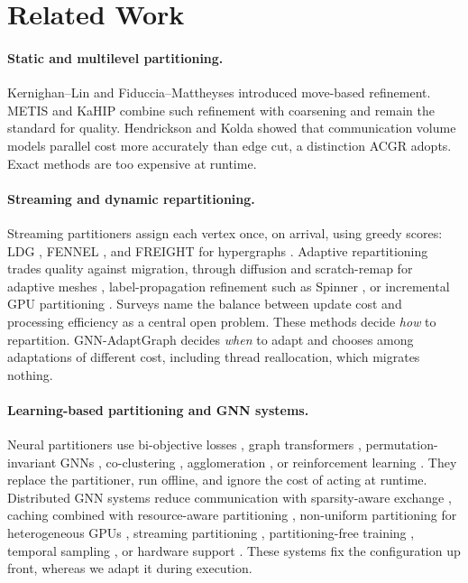 \section{Related Work}

\paragraph{Static and multilevel partitioning.}
Kernighan--Lin \cite{kernighan1970} and Fiduccia--Mattheyses \cite{fiduccia1982} introduced
move-based refinement. METIS \cite{karypis1998metis} and KaHIP \cite{sanders2013kahip} combine
such refinement with coarsening and remain the standard for quality. Hendrickson and Kolda
\cite{hendrickson2000models} showed that communication volume models parallel cost more
accurately than edge cut, a distinction ACGR adopts. Exact methods \cite{bruglieri2025mingap}
are too expensive at runtime.

\paragraph{Streaming and dynamic repartitioning.}
Streaming partitioners assign each vertex once, on arrival, using greedy scores: LDG
\cite{stanton2012ldg}, FENNEL \cite{tsourakakis2014fennel}, and FREIGHT for hypergraphs
\cite{eyubov2025freight}. Adaptive repartitioning trades quality against migration, through
diffusion and scratch-remap for adaptive meshes
\cite{schloegel2001wavefront,schloegel2000unified,damiand2024volume}, label-propagation
refinement such as Spinner \cite{martella2017spinner}, or incremental GPU partitioning
\cite{lee2025incremental}. Surveys \cite{dossantos2025landscape,zhang2026survey} name the
balance between update cost and processing efficiency as a central open problem. These
methods decide \emph{how} to repartition. GNN-AdaptGraph decides \emph{when} to adapt and
chooses among adaptations of different cost, including thread reallocation, which migrates
nothing.

\paragraph{Learning-based partitioning and GNN systems.}
Neural partitioners use bi-objective losses \cite{wei2025biobjective}, graph transformers
\cite{yang2026anchoring}, permutation-invariant GNNs \cite{hevapathige2026permutation},
co-clustering \cite{ragno2026coclustering}, agglomeration \cite{antonietti2025magnet}, or
reinforcement learning \cite{cao2025ddqn}. They replace the partitioner, run offline, and
ignore the cost of acting at runtime. Distributed GNN systems reduce communication with
sparsity-aware exchange \cite{mukhopadhyay2024sparsity}, caching combined with resource-aware
partitioning \cite{song2026capgnn}, non-uniform partitioning for heterogeneous GPUs
\cite{wang2025nugnn}, streaming partitioning \cite{mu2023streaming}, partitioning-free training
\cite{farkas2026softpart}, temporal sampling \cite{deng2024taser}, or hardware support
\cite{zhang2026nm,sahebi2025hashgrid}. These systems fix the configuration up front, whereas
we adapt it during execution.
